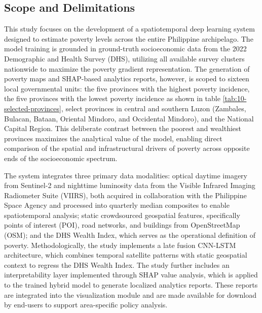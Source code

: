 \documentclass[12pt, letterpaper]{article}
\numberwithin{figure}{section}
\numberwithin{table}{section}
\begin{document}
\subsection{Scope and Delimitations}
This study focuses on the development of a spatiotemporal deep
learning system designed to estimate poverty levels across the
entire Philippine archipelago. The model training is grounded in
ground-truth socioeconomic data from the 2022 Demographic and
Health Survey (DHS), utilizing all available survey clusters
nationwide to maximize the poverty gradient representation. The
generation of poverty maps and SHAP-based analytics reports,
however, is scoped to sixteen local governmental units: the five
provinces with the highest poverty incidence, the five provinces
with the lowest poverty incidence as shown in table
\ref{tab:10-selected-provinces}, select provinces in central and
southern Luzon (Zambales, Bulacan, Bataan, Oriental Mindoro, and
Occidental Mindoro), and the National Capital Region.
This deliberate contrast between the poorest and wealthiest
provinces maximizes the analytical value of the model, enabling
direct comparison of the spatial and infrastructural drivers of
poverty across opposite ends of the socioeconomic spectrum.

The system integrates three primary data modalities: optical
daytime imagery from Sentinel-2 and nighttime luminosity data from
the Visible Infrared Imaging Radiometer Suite (VIIRS), both
acquired in collaboration with the Philippine Space Agency and
processed into quarterly median composites to enable spatiotemporal
analysis; static crowdsourced geospatial features, specifically
points of interest (POI), road networks, and buildings from
OpenStreetMap (OSM); and the DHS Wealth Index, which serves as the
operational definition of poverty. Methodologically, the study
implements a late fusion CNN-LSTM architecture, which combines
temporal satellite patterns with static geospatial context to
regress the DHS Wealth Index. The study further includes an
interpretability layer implemented through SHAP value analysis,
which is applied to the trained hybrid model to generate localized
analytics reports. These reports are integrated into the
visualization module and are made available for download by
end-users to support area-specific policy analysis.
\end{document}
